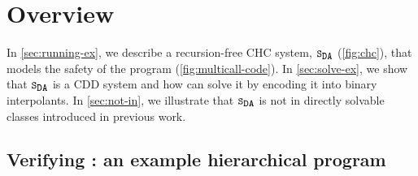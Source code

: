 \section{Overview}
\label{sec:overview}

In \autoref{sec:running-ex}, we describe a recursion-free CHC system,
$\mcchc$ (\autoref{fig:chc}), that models the safety of the program
 (\autoref{fig:multicall-code}).
%
In \autoref{sec:solve-ex}, we show that $\mcchc$ is a CDD system and
how \sys can solve it by encoding it into binary interpolants.
%
In \autoref{sec:not-in}, we illustrate that $\mcchc$ is not in
directly solvable classes introduced in previous work.
%

\subsection{Verifying : an example hierarchical program}
\label{sec:running-ex}

